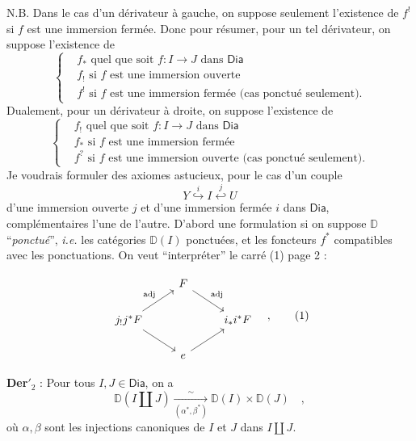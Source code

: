 \documentclass[11pt]{article}
\newcommand{\printedpage}[1]{\marginpar{\footnotesize p.~#1}}
\newcommand{\msp}[1]{\marginpar{\footnotesize [#1]}}
\newcommand{\Dia}{\mathsf{Dia}}
\newcommand{\DD}{\mathbb{D}}
\begin{document}
N.B. Dans le cas d'un dérivateur à gauche, on suppose seulement l'existence de $f^!$ si $f$ est une immersion fermée. Donc pour résumer, pour un tel dérivateur, on suppose l'existence de
\[
\left\{
\begin{aligned}
& f_* \text{ quel que soit } f : I \to J \text{ dans } \Dia \\
& f_! \text{ si } f \text{ est une immersion ouverte} \\
& f^! \text{ si } f \text{ est une immersion fermée (cas ponctué seulement).}
\end{aligned}
\right.
\]
Dualement, pour un dérivateur à droite, on suppose l'existence de
\[
\left\{
\begin{aligned}
& f_! \text{ quel que soit } f : I \to J \text{ dans } \Dia \\
& f_* \text{ si } f \text{ est une immersion fermée} \\
& f^? \text{ si } f \text{ est une immersion ouverte (cas ponctué seulement).}
\end{aligned}
\right.
\]
Je voudrais formuler des axiomes astucieux, pour le cas d'un couple
\[ Y \overset{i}{\hookrightarrow} I \overset{j}{\hookleftarrow} U \]
d'une immersion ouverte $j$ et d'une immersion fermée $i$ dans $\Dia$, complémentaires l'une de l'autre. D'abord une formulation si on suppose $\DD$ “\textit{ponctué}”, \textit{i.e.} les catégories $\DD(I)$ ponctuées, et les foncteurs $f^*$ compatibles avec les ponctuations. On veut “interpréter” le carré (1) page 2 :

\msp{page 8}

\[
\begin{tikzcd}
& F \arrow[dr, "\mathrm{adj}"] & \\
j_!j^*F \arrow[ur, "\mathrm{adj}"] \arrow[dr] & & i_*i^*F \\
& e \arrow[ur] &
\end{tikzcd}
\quad ,
\tag*{(1)}
\]

\textbf{Der}$'_2$ : Pour tous $I, J \in \Dia$, on a
\[ \DD(I \amalg J) \xrightarrow[(\alpha^*, \beta^*)]{\sim} \DD(I) \times \DD(J) \quad , \]
où $\alpha, \beta$ sont les injections canoniques de $I$ et $J$ dans $I \amalg J$.

\printedpage{7}
\end{document}
